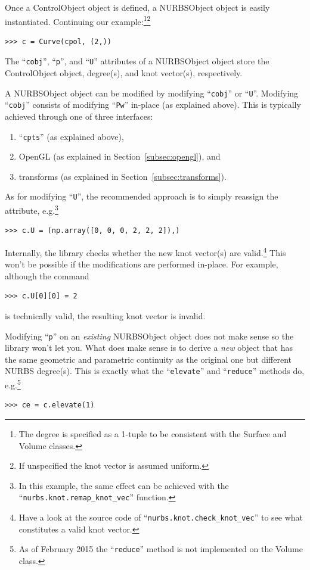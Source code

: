 \documentclass[]{article}
\begin{document}
Once a ControlObject object is defined, a NURBSObject object is easily 
instantiated.  Continuing our example:\footnote{The degree is specified 
as a 1-tuple to be consistent with the Surface and Volume 
classes.}\footnote{If unspecified the knot vector is assumed uniform.}
\begin{verbatim}
>>> c = Curve(cpol, (2,))
\end{verbatim}
The ``\texttt{cobj}'', ``\texttt{p}'', and ``\texttt{U}'' attributes of 
a NURBSObject object store the ControlObject object, degree(s), and knot 
vector(s), respectively.

A NURBSObject object can be modified by modifying ``\texttt{cobj}'' or 
``\texttt{U}''.  Modifying ``\texttt{cobj}'' consists of modifying 
``\texttt{Pw}'' in-place (as explained above).  This is typically 
achieved through one of three interfaces:
\begin{enumerate}
  \item ``\texttt{cpts}'' (as explained above),
  \item OpenGL (as explained in Section~\ref{subsec:opengl}), and
  \item transforms (as explained in Section~\ref{subsec:transforms}).
\end{enumerate}
As for modifying ``\texttt{U}'', the recommended approach is to simply 
reassign the attribute, e.g.\footnote{In this example, the same effect 
can be achieved with the ``\texttt{nurbs.knot.remap\_knot\_vec}'' 
function.}
\begin{verbatim}
>>> c.U = (np.array([0, 0, 0, 2, 2, 2]),)
\end{verbatim}
Internally, the library checks whether the new knot vector(s) are 
valid.\footnote{Have a look at the source code of 
``\texttt{nurbs.knot.check\_knot\_vec}'' to see what constitutes a valid 
knot vector.}  This won't be possible if the modifications are performed 
in-place.  For example, although the command
\begin{verbatim}
>>> c.U[0][0] = 2
\end{verbatim}
is technically valid, the resulting knot vector is invalid.

Modifying ``\texttt{p}'' on an \emph{existing} NURBSObject object does 
not make sense so the library won't let you.  What does make sense is to 
derive a \emph{new} object that has the same geometric and parametric 
continuity as the original one but different NURBS degree(s).  This is 
exactly what the ``\texttt{elevate}'' and ``\texttt{reduce}'' methods 
do, e.g.\footnote{As of February 2015 the ``\texttt{reduce}'' method is 
not implemented on the Volume class.}
\begin{verbatim}
>>> ce = c.elevate(1)
\end{verbatim}
\end{document}
